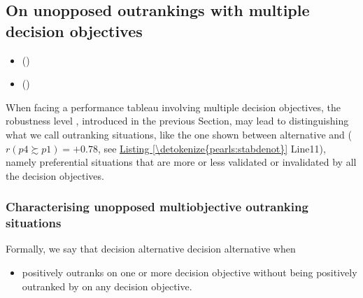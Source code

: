 \documentclass[a4paper,12pt,english]{sphinxhowto}
\begin{document}
\subsection{On unopposed outrankings with multiple decision objectives}
\label{\detokenize{pearls:on-unopposed-outrankings-with-multiple-decision-objectives}}\label{\detokenize{pearls:unopposed-outranking-tutorial-label}}
\begin{sphinxcontents}
\begin{itemize}
\item {} 
\sphinxAtStartPar
{}\label{\detokenize{pearls:id117}}{\hyperref[\detokenize{pearls:characterising-unopposed-multiobjective-outranking-situations}]{}} ()

\item {} 
\sphinxAtStartPar
{}\label{\detokenize{pearls:id118}}{\hyperref[\detokenize{pearls:computing-unopposed-multiobjective-choice-recommendations}]{}} ()

\end{itemize}
\end{sphinxcontents}

\sphinxAtStartPar
When facing a performance tableau involving multiple decision objectives, the robustness level , introduced in the previous Section, may lead to distinguishing what we call  outranking situations, like the one shown between alternative  and  (\(r(p4 \succsim p1) = +0.78\), see \hyperref[\detokenize{pearls:stabdenot}]{Listing \ref{\detokenize{pearls:stabdenot}}} Line11), namely preferential situations that are more or less validated or invalidated by all the decision objectives.


\subsubsection{Characterising unopposed multiobjective outranking situations}
\label{\detokenize{pearls:characterising-unopposed-multiobjective-outranking-situations}}
\sphinxAtStartPar
Formally, we say that decision alternative   decision alternative   when
\begin{itemize}
\item {} 
\sphinxAtStartPar
{} positively outranks  on one or more decision objective without  being positively outranked by  on any decision objective.

\end{itemize}
\end{document}
